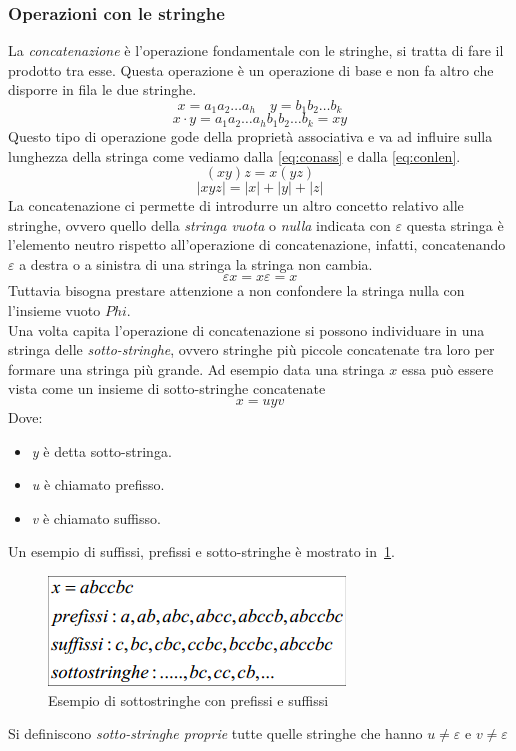 \subsubsection{Operazioni con le stringhe}
La \emph{concatenazione} è l'operazione fondamentale con le stringhe, si tratta di fare il prodotto tra esse. Questa operazione è un operazione di base e non fa altro che disporre in fila le due stringhe.
$$x = a_1a_2\dots a_h \quad y = b_1b_2\dots b_k$$
$$x\cdot y = a_1a_2\dots a_hb_1b_2\dots b_k = xy$$
Questo tipo di operazione gode della proprietà associativa e va ad influire sulla lunghezza della stringa come vediamo dalla \ref{eq:conass} e dalla \ref{eq:conlen}.
\begin{equation}\label{eq:conass}
	(xy)z = x(yz)
\end{equation}
\begin{equation}\label{eq:conlen}
	|xyz| = |x| + |y| + |z|
\end{equation}
La concatenazione ci permette di introdurre un altro concetto relativo alle stringhe, ovvero quello della \emph{stringa vuota} o \emph{nulla} indicata con $ \varepsilon $ questa stringa è l'elemento neutro rispetto all'operazione di concatenazione, infatti, concatenando $ \varepsilon $ a destra o a sinistra di una stringa la stringa non cambia.
$$\varepsilon x = x\varepsilon = x$$
Tuttavia bisogna prestare attenzione a non confondere la stringa nulla con l'insieme vuoto $Phi$.\\
Una volta capita l'operazione di concatenazione si possono individuare in una stringa delle \emph{sotto-stringhe}, ovvero stringhe più piccole concatenate tra loro per formare una stringa più grande.
Ad esempio data una stringa $x$ essa può essere vista come un insieme di sotto-stringhe concatenate
$$x = uyv$$
Dove:
\begin{itemize}
	\item \emph{y} è detta sotto-stringa.
	\item \emph{u} è chiamato prefisso.
	\item \emph{v} è chiamato suffisso.
\end{itemize}
Un esempio di suffissi, prefissi e sotto-stringhe è mostrato in \figurename\,\ref{fig:sufpref}.
\begin{figure}
	\centering
	\includegraphics[width=0.5\linewidth]{img/substr.png}
	\caption{Esempio di sottostringhe con prefissi e suffissi}\label{fig:sufpref}
\end{figure}

Si definiscono \emph{sotto-stringhe proprie} tutte quelle stringhe che hanno $u\neq \varepsilon$ e $v \neq \varepsilon$